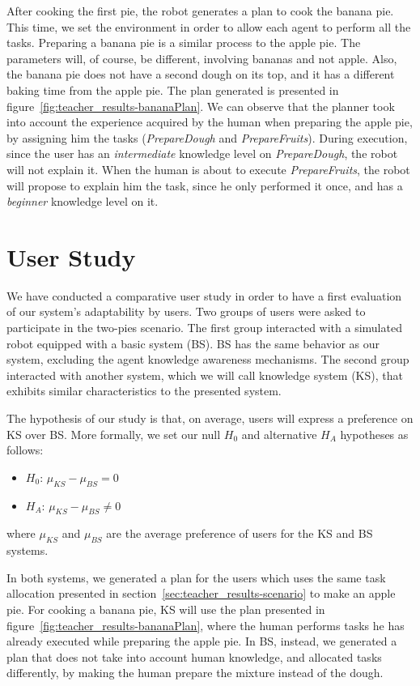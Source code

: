 After cooking the first pie, the robot generates a plan to cook the banana pie. This time, we set the environment in order to allow  each agent to perform all the tasks. Preparing a banana pie is a similar process to the apple pie. The parameters will, of course, be different, involving bananas and not apple. Also, the banana pie does not have a second dough on its top, and it has a different baking time from the apple pie. The plan generated is presented in figure~\ref{fig:teacher_results-bananaPlan}. We can observe that the planner took into account the experience acquired by the human when preparing the apple pie, by assigning him the tasks (\textit{PrepareDough} and \textit{PrepareFruits}). During execution, since the user has an \textit{intermediate} knowledge level on \textit{PrepareDough}, the robot will not explain it. When the human is about to execute \textit{PrepareFruits}, the robot will propose to explain him the task, since he only performed it once, and has a \textit{beginner} knowledge level on it.


\section{User Study}
\label{sec:teacher_results-user_study}
We have conducted a comparative user study in order to have a first evaluation of our system's adaptability by users. Two groups of users were asked to participate in the two-pies scenario. The first group interacted with a simulated robot equipped with a basic system (BS). BS has the same behavior as our system, excluding the agent knowledge awareness mechanisms. The second group interacted with another system, which we will call knowledge system (KS), that exhibits similar characteristics to the presented system.

The hypothesis of our study is that, on average, users will express a preference on KS over BS. More formally, we set our null $H_0$ and alternative $H_A$ hypotheses as follows:
\begin{itemize}
\item $H_0$: $\mu_{KS}-\mu_{BS}=0$ 
\item $H_A$: $\mu_{KS}-\mu_{BS} \neq 0$  
\end{itemize}
where $\mu_{KS}$ and $\mu_{BS}$ are the average preference of users for the KS and BS systems.

In both systems, we generated a plan for the users which uses the same task  allocation presented in section~\ref{sec:teacher_results-scenario} to make an apple pie. For cooking a banana pie, KS will use the plan presented in figure~\ref{fig:teacher_results-bananaPlan}, where the human performs tasks he has already executed while preparing the apple pie. In BS, instead, we generated a plan that does not take into account human knowledge, and allocated tasks differently, by making the human prepare the mixture instead of the dough.

